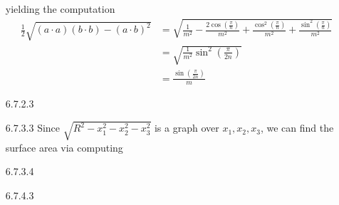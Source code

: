 \documentclass[12pt, letterpaper]{article}
\begin{document}
\begin{enumerate}
	yielding the computation 
	\begin{align*}
	\frac{1}{2}\sqrt{(a\cdot a)(b \cdot b) - (a \cdot b)^2}
	&= \sqrt{\frac{1}{m^2} - \frac{2\cos(\frac{\pi}{n})}{m^2}+ 
	\frac{\cos^2(\frac{\pi}{n})}{m^2}+ 
	\frac{\sin^2(\frac{\pi}{n})}{m^2}} \\ 
	&= \sqrt{\frac{1}{m^2} \sin^2(\frac{\pi}{2n})}\\
	&= \frac{\sin(\frac{\pi}{2n})}{m}
	\end{align*}
	\item[6.7.2.3]
	\item[6.7.3.3] Since $\sqrt{R^2 - x_1^2- x_2^2- x_3^2}$ is a 
	graph over $x_1,x_2,x_3$, we can find the surface area via 
	computing 
	\item[6.7.3.4]
	\item[6.7.4.3]
\end{enumerate}
\end{document}
